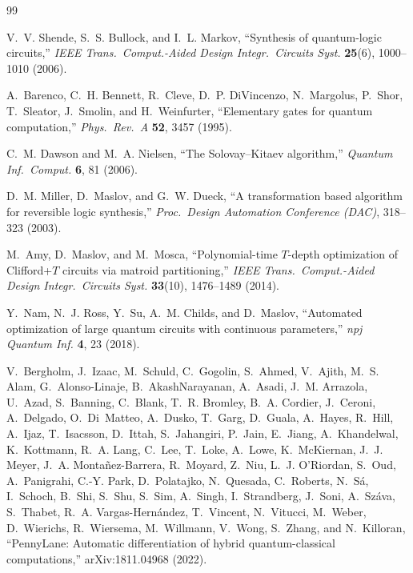 \documentclass[11pt]{article}
\begin{document}
\begin{thebibliography}{99}

V.~V. Shende, S.~S. Bullock, and I.~L. Markov,
``Synthesis of quantum-logic circuits,''
\emph{IEEE Trans.\ Comput.-Aided Design Integr.\ Circuits Syst.} \textbf{25}(6), 1000--1010 (2006).

A.~Barenco, C.~H. Bennett, R.~Cleve, D.~P. DiVincenzo, N.~Margolus, P.~Shor, T.~Sleator, J.~Smolin, and H.~Weinfurter,
``Elementary gates for quantum computation,''
\emph{Phys.\ Rev.\ A} \textbf{52}, 3457 (1995).

C.~M. Dawson and M.~A. Nielsen,
``The Solovay--Kitaev algorithm,''
\emph{Quantum Inf.\ Comput.} \textbf{6}, 81 (2006).

D.~M. Miller, D.~Maslov, and G.~W. Dueck,
``A transformation based algorithm for reversible logic synthesis,''
\emph{Proc.\ Design Automation Conference (DAC)}, 318--323 (2003).

M.~Amy, D.~Maslov, and M.~Mosca,
``Polynomial-time $T$-depth optimization of Clifford+$T$ circuits via matroid partitioning,''
\emph{IEEE Trans.\ Comput.-Aided Design Integr.\ Circuits Syst.} \textbf{33}(10), 1476--1489 (2014).

Y.~Nam, N.~J. Ross, Y.~Su, A.~M. Childs, and D.~Maslov,
``Automated optimization of large quantum circuits with continuous parameters,''
\emph{npj Quantum Inf.} \textbf{4}, 23 (2018).

V.~Bergholm, J.~Izaac, M.~Schuld, C.~Gogolin, S.~Ahmed, V.~Ajith, M.~S. Alam, G.~Alonso-Linaje, B.~AkashNarayanan, A.~Asadi, J.~M. Arrazola, U.~Azad, S.~Banning, C.~Blank, T.~R. Bromley, B.~A. Cordier, J.~Ceroni, A.~Delgado, O.~Di~Matteo, A.~Dusko, T.~Garg, D.~Guala, A.~Hayes, R.~Hill, A.~Ijaz, T.~Isacsson, D.~Ittah, S.~Jahangiri, P.~Jain, E.~Jiang, A.~Khandelwal, K.~Kottmann, R.~A. Lang, C.~Lee, T.~Loke, A.~Lowe, K.~McKiernan, J.~J. Meyer, J.~A. Monta\~nez-Barrera, R.~Moyard, Z.~Niu, L.~J. O'Riordan, S.~Oud, A.~Panigrahi, C.-Y. Park, D.~Polatajko, N.~Quesada, C.~Roberts, N.~S\'a, I.~Schoch, B.~Shi, S.~Shu, S.~Sim, A.~Singh, I.~Strandberg, J.~Soni, A.~Sz\'ava, S.~Thabet, R.~A. Vargas-Hern\'andez, T.~Vincent, N.~Vitucci, M.~Weber, D.~Wierichs, R.~Wiersema, M.~Willmann, V.~Wong, S.~Zhang, and N.~Killoran,
``PennyLane: Automatic differentiation of hybrid quantum-classical computations,''
arXiv:1811.04968 (2022).

\end{thebibliography}
\end{document}
